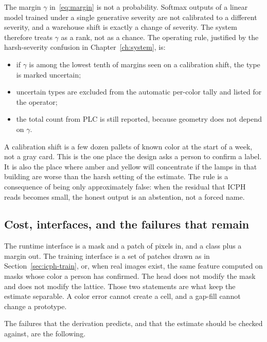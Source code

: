 The margin $\gamma$ in~\eqref{eq:margin} is not a probability. Softmax outputs of a linear model trained under a single generative severity are not calibrated to a different severity, and a warehouse shift is exactly a change of severity. The system therefore treats $\gamma$ as a rank, not as a chance. The operating rule, justified by the harsh-severity confusion in Chapter~\ref{ch:system}, is:

\begin{itemize}
\item if $\gamma$ is among the lowest tenth of margins seen on a calibration shift, the type is marked uncertain;
\item uncertain types are excluded from the automatic per-color tally and listed for the operator;
\item the total count from PLC is still reported, because geometry does not depend on $\gamma$.
\end{itemize}

A calibration shift is a few dozen pallets of known color at the start of a week, not a gray card. This is the one place the design asks a person to confirm a label. It is also the place where amber and yellow will concentrate if the lamps in that building are worse than the harsh setting of the estimate. The rule is a consequence of  being only approximately false: when the residual that ICPH reads becomes small, the honest output is an abstention, not a forced name.

\subsection{Cost, interfaces, and the failures that remain}
\label{sec:icph-cost}

The runtime interface is a mask and a patch of pixels in, and a class plus a margin out. The training interface is a set of patches drawn as in Section~\ref{sec:icph-train}, or, when real images exist, the same feature computed on masks whose color a person has confirmed. The head does not modify the mask and does not modify the lattice. Those two statements are what keep the estimate separable. A color error cannot create a cell, and a gap-fill cannot change a prototype.

The failures that the derivation predicts, and that the estimate should be checked against, are the following.

